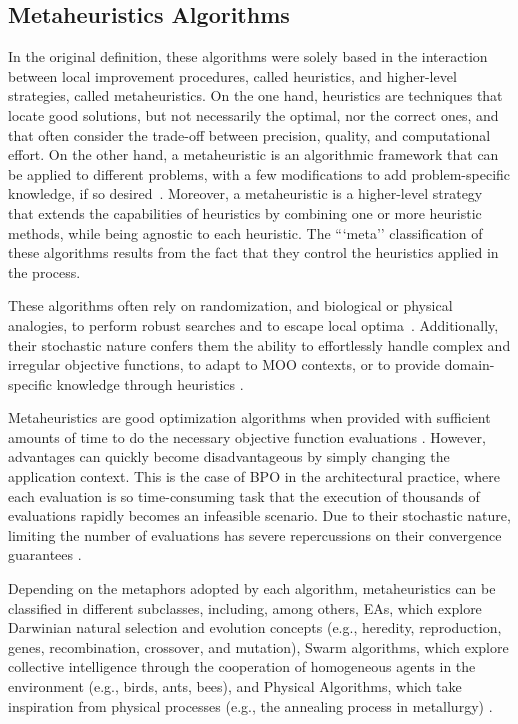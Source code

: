 	\subsection{Metaheuristics Algorithms}
	\label{ssec:metaheuristics}
	In the original definition, these algorithms were solely based in the interaction between local improvement procedures, called heuristics, and higher-level strategies, called metaheuristics. On the one hand, heuristics are techniques that locate good solutions, but not necessarily the optimal, nor the correct ones, and that often consider the trade-off between precision, quality, and computational effort. On the other hand, a metaheuristic is an algorithmic framework that can be applied to different problems, with a few modifications to add problem-specific knowledge, if so desired~\cite{Glover2003Metaheuristics}. Moreover, a metaheuristic is a higher-level strategy that extends the capabilities of heuristics by combining one or more heuristic methods, while being agnostic to each heuristic. The ```meta'' classification of these algorithms results from the fact that they control the heuristics applied in the process.
	
	These algorithms often rely on randomization, and biological or physical analogies, to perform robust searches and to escape local optima~\cite{Glover2003Metaheuristics}. Additionally, their stochastic nature confers them the ability to effortlessly handle complex and irregular objective functions, to adapt to \ac{MOO} contexts, or to provide domain-specific knowledge through heuristics \cite{Wortmann2017GABESTCHOICE}.
	
	Metaheuristics are good optimization algorithms when provided with sufficient amounts of time to do the necessary objective function evaluations \cite{Conn2009}. However, advantages can quickly become disadvantageous by simply changing the application context. This is the case of BPO in the architectural practice, where each evaluation is so time-consuming task that the execution of thousands of evaluations rapidly becomes an infeasible scenario. Due to their stochastic nature, limiting the number of evaluations has severe repercussions on their convergence guarantees \cite{Hasancebi2009}.
	
	Depending on the metaphors adopted by each algorithm, metaheuristics can be classified in different subclasses, including, among others, \acp{EA}, which explore Darwinian natural selection and evolution concepts (e.g., heredity, reproduction, genes, recombination, crossover, and mutation), Swarm algorithms, which explore collective intelligence through the cooperation of homogeneous agents in the environment (e.g., birds, ants, bees), and Physical Algorithms, which take inspiration from physical processes (e.g., the annealing process in metallurgy) \cite{Brownlee2011}.
	
